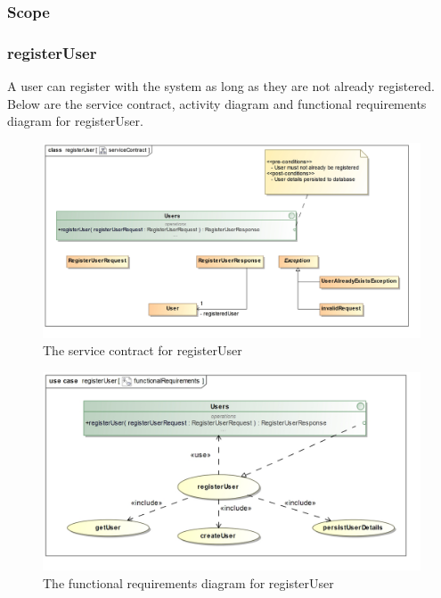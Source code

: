 \subsubsection{Scope}


\subsubsection{registerUser}

A user can register with the system as long as they are not already registered. Below are the service contract, activity diagram and functional requirements diagram for registerUser.

\begin{figure}[H]
	\centering
	\includegraphics[scale=0.21]{../images/funcReq/registerUserServiceContract.jpg}
	\caption{The service contract for registerUser \label{overflow}}
\end{figure}

\begin{figure}[H]
	\centering
	\includegraphics[width=1.1\textwidth]{../images/funcReq/registerUserFunctionalRequirements.jpg}
	\caption{The functional requirements diagram for registerUser \label{overflow}}
\end{figure}

